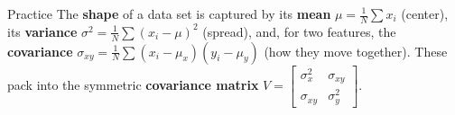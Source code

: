 \documentclass[10pt]{article}
\begin{document}
\namedateperiod

\vspace{0.12in}

\begin{notesbox}{Practice}
The \textbf{shape} of a data set is captured by its \textbf{mean} $\mu=\frac1N\sum x_i$ (center), its
\textbf{variance} $\sigma^2=\frac1N\sum(x_i-\mu)^2$ (spread), and, for two features, the \textbf{covariance}
$\sigma_{xy}=\frac1N\sum(x_i-\mu_x)(y_i-\mu_y)$ (how they move together). These pack into the symmetric
\textbf{covariance matrix} $V=\left[\begin{smallmatrix}\sigma_x^2 & \sigma_{xy}\\ \sigma_{xy} & \sigma_y^2\end{smallmatrix}\right]$.


\end{notesbox}
\end{document}

